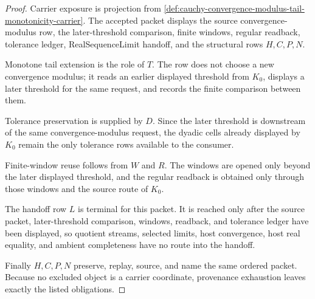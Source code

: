 \begin{proof}
Carrier exposure is projection from \autoref{def:cauchy-convergence-modulus-tail-monotonicity-carrier}. The accepted packet displays the source convergence-modulus row, the later-threshold comparison, finite windows, regular readback, tolerance ledger, RealSequenceLimit handoff, and the structural rows $H,C,P,N$.

Monotone tail extension is the role of $T$. The row does not choose a new convergence modulus; it reads an earlier displayed threshold from $K_0$, displays a later threshold for the same request, and records the finite comparison between them.

Tolerance preservation is supplied by $D$. Since the later threshold is downstream of the same convergence-modulus request, the dyadic cells already displayed by $K_0$ remain the only tolerance rows available to the consumer.

Finite-window reuse follows from $W$ and $R$. The windows are opened only beyond the later displayed threshold, and the regular readback is obtained only through those windows and the source route of $K_0$.

The handoff row $L$ is terminal for this packet. It is reached only after the source packet, later-threshold comparison, windows, readback, and tolerance ledger have been displayed, so quotient streams, selected limits, host convergence, host real equality, and ambient completeness have no route into the handoff.

Finally $H,C,P,N$ preserve, replay, source, and name the same ordered packet. Because no excluded object is a carrier coordinate, provenance exhaustion leaves exactly the listed obligations.
\end{proof}

